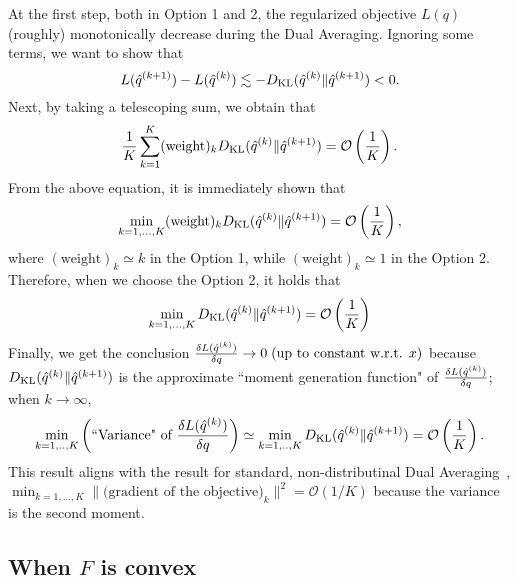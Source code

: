 At the first step, both in Option 1 and 2, the regularized objective $L(q)$ (roughly) monotonically decrease during the Dual Averaging. Ignoring some terms, we want to show that
\begin{equation}
    L(\hat{q}^{(k+1)}) - L(\hat{q}^{(k)}) \lesssim - D_{\mathrm{KL}}(\hat{q}^{(k)}\|\hat{q}^{(k+1)}) < 0.
\end{equation}
Next, by taking a telescoping sum, we obtain that
\begin{equation}
    \frac{1}{K}\sum_{k=1}^K (\text{weight})_k D_{\mathrm{KL}}(\hat{q}^{(k)}\|\hat{q}^{(k+1)}) = \mathcal{O}\left(\frac{1}{K}\right).
\end{equation}
From the above equation, it is immediately shown that
\begin{equation}
    \min_{k=1,...,K} (\text{weight})_k D_{\mathrm{KL}}(\hat{q}^{(k)}\|\hat{q}^{(k+1)}) = \mathcal{O}\left(\frac{1}{K}\right),
\end{equation}
where $(\text{weight})_k \simeq k$ in the Option 1, while $(\text{weight})_k \simeq 1$ in the Option 2.
Therefore, when we choose the Option 2, it holds that
\begin{equation}
    \min_{k=1,...,K} D_{\mathrm{KL}}(\hat{q}^{(k)}\|\hat{q}^{(k+1)}) = \mathcal{O}\left(\frac{1}{K}\right)
\end{equation}
Finally, we get the conclusion $\frac{\delta L(\hat{q}^{(k)})}{\delta q} \to 0\; \text{(up to constant w.r.t. $x$)}$ because $D_{\mathrm{KL}}(\hat{q}^{(k)}\|\hat{q}^{(k+1)})$ is the approximate ``moment generation function" of $\frac{\delta L(\hat{q}^{(k)})}{\delta q}$; when $k \to \infty$,
\begin{equation}
    \min_{k=1,..,K}\left(\text{``Variance" of }\frac{\delta L(\hat{q}^{(k)})}{\delta q} \right) \simeq \min_{k=1,..,K} D_{\mathrm{KL}}(\hat{q}^{(k)}\|\hat{q}^{(k+1)}) = \mathcal{O}\left(\frac{1}{K}\right).
\end{equation}
This result aligns with the result for standard, non-distributinal Dual Averaging~\citep{LIU2023nonconvexDA}, $\min_{k=1,...,K}\|\text{(gradient of the objective)}_k\|^2 = \mathcal{O}(1/K)$ because the variance is the second moment.

\subsection{When $F$ is convex\label{section:da-convex-proof}}\label{sec:AppendixConvProof}

